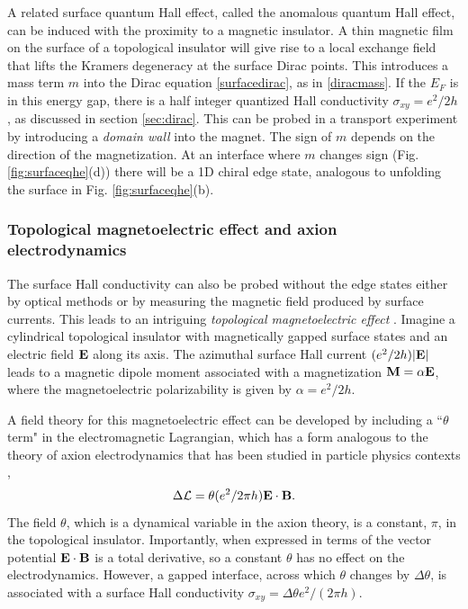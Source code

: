 \documentclass[twocolumn,floatfix,showpacs,rmp,aps]{revtex4}
\begin{document}
A related surface quantum Hall effect, called the anomalous quantum Hall
effect, can be induced with the proximity to a
magnetic insulator.  A thin magnetic
film on the surface of a topological insulator will give rise to a local exchange
field that lifts the Kramers degeneracy at the surface Dirac points.  This
introduces a mass term $m$ into the Dirac equation \eqref{surfacedirac},
as in \eqref{diracmass}.  If the $E_F$ is in this energy
gap, there is a half integer quantized Hall conductivity
$\sigma_{xy}=e^2/2h$\cite{pankratov87}, as discussed in section \ref{sec:dirac}.
This can be probed in a transport experiment by introducing a {\it domain
wall} into the magnet.  The sign of $m$ depends on the direction of
the magnetization.  At an interface where $m$ changes sign (Fig. \ref{fig:surfaceqhe}(d))
there will be a 1D chiral edge state, analogous to unfolding the
surface in Fig. \ref{fig:surfaceqhe}(b).

\subsubsection{Topological magnetoelectric effect and axion electrodynamics}
\label{sec:topomag}

The surface Hall conductivity can also be probed without the
edge states either by optical methods or by measuring the magnetic field produced by surface
currents.  This leads to an intriguing {\it topological magnetoelectric effect} \cite{qihugheszhang08,essin09}.
Imagine a cylindrical topological insulator with magnetically gapped surface
states and an electric field ${\bf E}$ along its axis.  The azimuthal surface Hall
current $(e^2/2h)|{\bf E}|$ leads to a magnetic dipole moment associated
with a magnetization ${\bf M} = \alpha{\bf E}$, where the magnetoelectric polarizability
is given by $\alpha = e^2/2h$.

A field theory for this magnetoelectric effect can be developed by including a
``$\theta$ term" in the electromagnetic Lagrangian, which has a form analogous to
the theory of axion electrodynamics that has been studied in particle
physics contexts \cite{wilczek87},
\begin{equation}
\Delta {\cal L} = \theta (e^2/2\pi h) {\bf E}\cdot{\bf B}.
\label{edotb}
\end{equation}
The field $\theta$, which is a dynamical variable in the axion theory, is
a constant, $\pi$, in the topological insulator.
Importantly, when expressed in terms of the vector potential ${\bf E}\cdot {\bf
B}$ is a total derivative, so a constant $\theta$ has no effect on the
electrodynamics.  However, a gapped interface,
across which $\theta$ changes by $\Delta\theta$, is
associated with a surface Hall conductivity $\sigma_{xy} = \Delta\theta e^2/(2\pi h)$.
\end{document}
